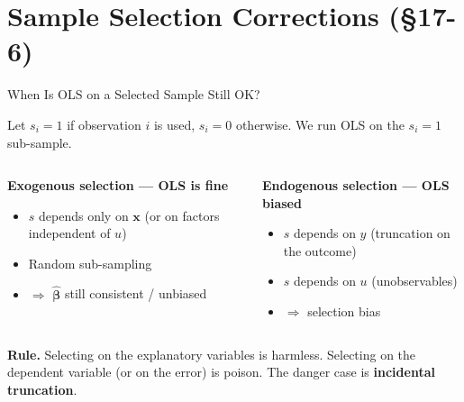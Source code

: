 \documentclass[aspectratio=169, 12pt]{beamer}
\begin{document}
\section{Sample Selection Corrections (\S17-6)}

\begin{frame}[shrink=10]{When Is OLS on a Selected Sample Still OK?}

  Let $s_i=1$ if observation $i$ is used, $s_i=0$ otherwise. We run OLS on the
  $s_i=1$ sub-sample.

  \smallskip

  \begin{columns}[t]
    \begin{highlightbox}
      \textbf{\textcolor{positive}{Exogenous selection --- OLS is fine}}
      \begin{itemize}
        \item $s$ depends only on $\mathbf{x}$ (or on factors independent of $u$)
        \item Random sub-sampling
        \item $\Rightarrow$ $\hat{\boldsymbol\beta}$ still consistent / unbiased
      \end{itemize}
    \end{highlightbox}

    \begin{highlightbox}
      \textbf{\textcolor{negative}{Endogenous selection --- OLS biased}}
      \begin{itemize}
        \item $s$ depends on $y$ (truncation on the outcome)
        \item $s$ depends on $u$ (unobservables)
        \item $\Rightarrow$ selection bias
      \end{itemize}
    \end{highlightbox}
  \end{columns}

  \smallskip

  \begin{keybox}
    \textbf{Rule.} Selecting on the explanatory variables is harmless. Selecting
    on the dependent variable (or on the error) is poison. The danger case is
    \textbf{incidental truncation}.
  \end{keybox}

\end{frame}
\end{document}
